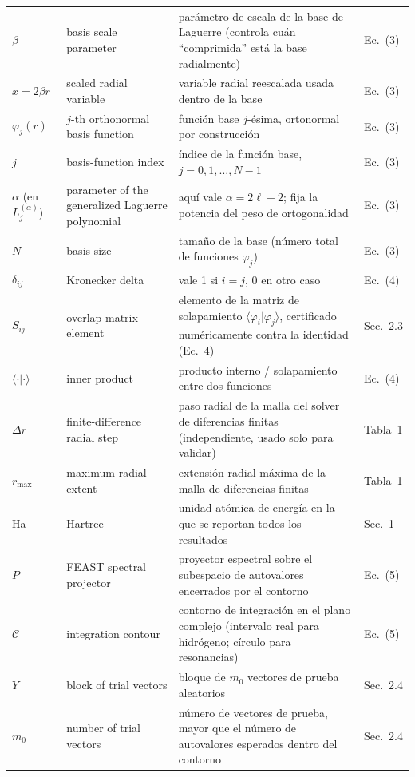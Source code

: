 \documentclass[11pt]{article}
\begin{document}
\begin{longtable}{@{}L{1.6cm}L{5.2cm}L{7.6cm}L{2.2cm}@{}}
$\beta$ & basis scale parameter & par\'ametro de escala de la base de
  Laguerre (controla cu\'an ``comprimida'' est\'a la base radialmente) &
  Ec.~(3) \\
$x=2\beta r$ & scaled radial variable & variable radial reescalada usada
  dentro de la base & Ec.~(3) \\
$\varphi_j(r)$ & $j$-th orthonormal basis function & funci\'on base
  $j$-\'esima, ortonormal por construcci\'on & Ec.~(3) \\
$j$ & basis-function index & \'indice de la funci\'on base,
  $j=0,1,\dots,N-1$ & Ec.~(3) \\
$\alpha$ (en $L_j^{(\alpha)}$) & parameter of the generalized Laguerre
  polynomial & aqu\'i vale $\alpha=2\ell+2$; fija la potencia del peso de
  ortogonalidad & Ec.~(3) \\
$N$ & basis size & tama\~no de la base (n\'umero total de funciones
  $\varphi_j$) & Ec.~(3) \\
$\delta_{ij}$ & Kronecker delta & vale 1 si $i=j$, 0 en otro caso & Ec.~(4) \\
$S_{ij}$ & overlap matrix element & elemento de la matriz de
  solapamiento $\langle\varphi_i|\varphi_j\rangle$, certificado num\'ericamente
  contra la identidad (Ec.~4) & Sec.~2.3 \\
$\langle\cdot|\cdot\rangle$ & inner product & producto interno /
  solapamiento entre dos funciones & Ec.~(4) \\
$\Delta r$ & finite-difference radial step & paso radial de la malla del
  solver de diferencias finitas (independiente, usado solo para validar) &
  Tabla~1 \\
$r_{\max}$ & maximum radial extent & extensi\'on radial m\'axima de la
  malla de diferencias finitas & Tabla~1 \\
Ha & Hartree & unidad at\'omica de energ\'ia en la que se reportan todos los
  resultados & Sec.~1 \\
$P$ & FEAST spectral projector & proyector espectral sobre el subespacio de
  autovalores encerrados por el contorno & Ec.~(5) \\
$\mathcal{C}$ & integration contour & contorno de integraci\'on en el plano
  complejo (intervalo real para hidr\'ogeno; c\'irculo para resonancias) &
  Ec.~(5) \\
$Y$ & block of trial vectors & bloque de $m_0$ vectores de prueba
  aleatorios & Sec.~2.4 \\
$m_0$ & number of trial vectors & n\'umero de vectores de prueba, mayor que
  el n\'umero de autovalores esperados dentro del contorno & Sec.~2.4 \\

\end{longtable}
\end{document}
